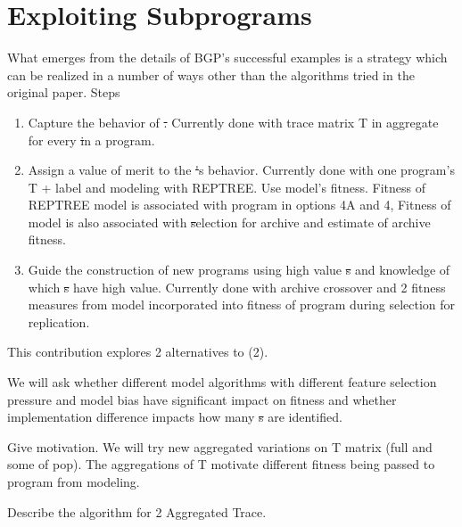 \section{Exploiting Subprograms}\label{sect:foreground}
What emerges from the details of BGP's successful examples is a strategy which can be realized in a number of ways other than the algorithms tried in the original paper.
Steps
\begin{enumerate}
\item Capture the behavior of \st. Currently done with trace matrix T in aggregate for every \st in a program.
\item Assign a value of merit to the \st's behavior. Currently done with one program's T + label and modeling with REPTREE. Use model's fitness. Fitness of REPTREE model is associated with program in options 4A and 4, Fitness of model is also associated with \st selection for archive and estimate of archive fitness.
\item Guide the construction of new programs using high value \st{s} and knowledge of which \st{s} have high value. Currently done with archive crossover and 2 fitness measures from model incorporated into fitness of program during selection for replication.
\end{enumerate}

This contribution explores 2 alternatives to (2). \begin{inparaenum}\item We will ask whether different model algorithms  with different feature selection pressure and model bias have significant impact on fitness and whether implementation difference impacts how many  \st{s} are identified.  \item Give motivation. We will try new aggregated variations on T matrix  (full and some of pop). The aggregations of T motivate different fitness being passed to program from modeling.\end{inparaenum}
Describe the algorithm for 2 Aggregated Trace.




